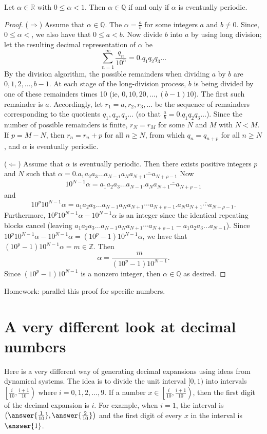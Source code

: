 \documentclass{ximera}
\begin{document}
\begin{theorem}
 Let $\alpha\in\mathbb{R}$ with $0\leq\alpha<1$. Then $\alpha\in\mathbb{Q}$ if and only if $\alpha$ is eventually periodic.
\end{theorem}
\begin{proof}
 ($\Rightarrow$)  Assume that $\alpha\in\mathbb{Q}$. The  $\alpha=\frac{a}{b}$ for some integers $a$ and $b\neq0$. Since, $0\leq\alpha<$, we also have that $0\leq a<b$. Now divide $b$ into $a$ by using long division; let the resulting decimal representation of $\alpha$ be  \[\displaystyle\sum_{n=1}^\infty \frac{q_n}{10^n}=0.q_1q_2q_3\dots\]
 By the division algorithm, the possible remainders when dividing $a$ by $b$ are $0,1,2,\dots,b-1$. At each stage of the long-division process, $b$ is being divided by one of these remainders times 10 (ie, $0,10,20,\dots,(b-1)10$). The first such remainder is $a$. Accordingly, let $r_1=a,r_2,r_3,\dots$ be the sequence of remainders corresponding to the quotients $q_1,q_2,q_3\dots$ (so that $\frac{a}{b}=0.q_1q_2q_3\dots$). Since the number of possible remainders is finite, $r_N=r_M$ for some $N$ and $M$ with $N<M$. If $p=M-N$, then $r_n=r_n+p$ for all $n\geq N$, from which $q_n=q_{n+p}$ for all $n\geq N$, and $\alpha$ is eventually periodic.
 
 ($\Leftarrow$) Assume that $\alpha$ is eventually periodic. Then there exists positive integers $p$ and $N$ such that 
$\alpha=0.a_1a_2a_3\dots a_{N-1}\overline{a_Na_{N+1}\cdots a_{N+\rho-1}}$ Now \[10^{N-1}\alpha=a_1a_2a_3\dots a_{N-1}.\overline{a_Na_{N+1}\cdots a_{N+\rho-1}}\] and \[10^p10^{N-1}\alpha=a_1a_2a_3\dots a_{N-1}a_Na_{N+1}\cdots a_{N+\rho-1}.\overline{a_Na_{N+1}\cdots a_{N+\rho-1}}.\] Furthermore, $10^p10^{N-1}\alpha-10^{N-1}\alpha$ is an integer since the identical repeating blocks cancel (leaving $a_1a_2a_3\dots a_{N-1}a_Na_{N+1}\cdots a_{N+\rho-1}-a_1a_2a_3\dots a_{N-1}$). Since $10^p10^{N-1}\alpha-10^{N-1}\alpha=(10^p-1)10^{N-1}\alpha$, we have that $(10^p-1)10^{N-1}\alpha=m\in\mathbb{Z}$. Then \[\alpha=\frac{m}{(10^p-1)10^{N-1}}.\] Since $(10^p-1)10^{N-1}$ is a nonzero integer, then $\alpha\in\mathbb{Q}$ as desired.
\end{proof}

Homework: parallel this proof for specific numbers.

\section*{A very different look at decimal numbers}
Here is a very different way of generating decimal expansions using ideas from dynamical systems. The idea is to divide the unit interval $[0,1)$ into intervals $\left[\frac{i}{10},\frac{i+1}{10}\right)$ where $i=0,1,2,\dots,9$. If a number $x\in\left[\frac{i}{10},\frac{i+1}{10}\right)$, then the first digit of the decimal expansion is $i$. For example, when $i=1$, the interval is $\left(\answer{\frac{1}{10}},\answer{\frac{2}{10}}\right)$ and the first digit of every $x$ in the interval is $\answer{1}$.
\end{document}
